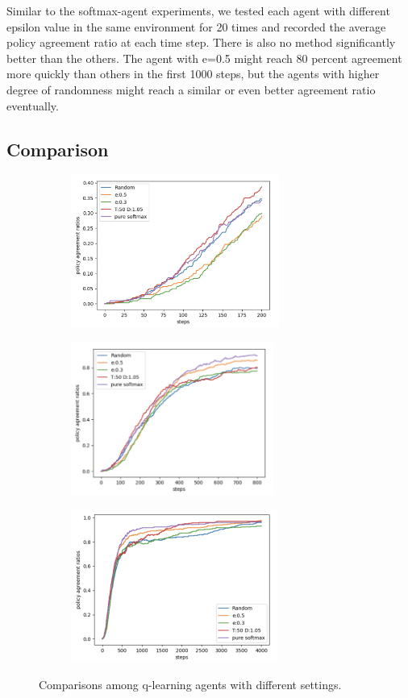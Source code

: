 \documentclass{article}
\begin{document}
Similar to the softmax-agent experiments, we tested each agent with different epsilon value in the same environment for 20 times and recorded the average policy agreement ratio at each time step. There is also no method significantly better than the others. The agent with e=0.5 might reach 80 percent agreement more quickly than others in the first 1000 steps, but the agents with higher degree of randomness might reach a similar or even better agreement ratio eventually.


\subsection{Comparison}
\begin{figure}[h]
	\begin{subfigure}{0.5\textwidth}
		\includegraphics[width=0.9\linewidth, height=5cm]{images/both_0_200.png} 
		\caption{}
	\end{subfigure}
	\begin{subfigure}{0.5\textwidth}
		\includegraphics[width=0.9\linewidth, height=5cm]{images/both_0_800.png}
		\caption{}
	\end{subfigure}
	\begin{subfigure}{0.5\textwidth}
		\includegraphics[width=0.9\linewidth, height=5cm]{images/both_0_4000.png}
		\caption{}
	\end{subfigure}
	\caption{Comparisons among q-learning agents with different settings.}
\end{figure}
\end{document}
